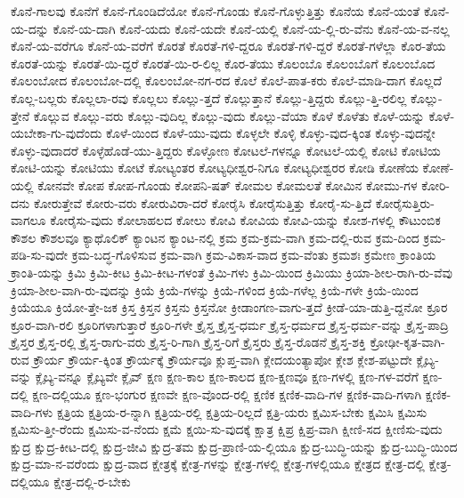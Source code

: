 {ಕೊನೆ-ಗಾಲವು
ಕೊನೆಗೆ
ಕೊನೆ-ಗೊಂಡಿದೆಯೋ
ಕೊನೆ-ಗೊಂಡು
ಕೊನೆ-ಗೊಳ್ಳುತ್ತಿತ್ತು
ಕೊನೆಯ
ಕೊನೆ-ಯಂತೆ
ಕೊನೆ-ಯ-ದನ್ನು
ಕೊನೆ-ಯ-ದಾಗಿ
ಕೊನೆ-ಯದು
ಕೊನೆ-ಯದೇ
ಕೊನೆ-ಯಲ್ಲಿ
ಕೊನೆ-ಯ-ಲ್ಲಿ-ರು-ವೆನು
ಕೊನೆ-ಯ-ವ-ನಲ್ಲ
ಕೊನೆ-ಯ-ವರೆಗೂ
ಕೊನೆ-ಯ-ವರೆಗೆ
ಕೊರತೆ
ಕೊರತೆ-ಗಳಿ-ದ್ದರೂ
ಕೊರತೆ-ಗಳಿ-ದ್ದರೆ
ಕೊರತೆ-ಗಳೆಲ್ಲಾ
ಕೊರ-ತೆಯ
ಕೊರತೆ-ಯನ್ನು
ಕೊರತೆ-ಯಿ-ದ್ದರೆ
ಕೊರತೆ-ಯಿ-ರ-ಲಿಲ್ಲ
ಕೊರ-ತೆಯು
ಕೊಲಂಬೊ
ಕೊಲಂಬೊಗೆ
ಕೊಲಂಬೊದ
ಕೊಲಂಬೋದ
ಕೊಲಂಬೋ-ದಲ್ಲಿ
ಕೊಲಂಬೋ-ನಗ-ರದ
ಕೊಲೆ
ಕೊಲೆ-ಪಾತ-ಕರು
ಕೊಲೆ-ಮಾಡಿ-ದಾಗ
ಕೊಲ್ಲದೆ
ಕೊಲ್ಲ-ಬಲ್ಲರು
ಕೊಲ್ಲಲಾ-ರವು
ಕೊಲ್ಲಲು
ಕೊಲ್ಲು-ತ್ತದೆ
ಕೊಲ್ಲುತ್ತಾನೆ
ಕೊಲ್ಲು-ತ್ತಿದ್ದರು
ಕೊಲ್ಲು-ತ್ತಿ-ರಲಿಲ್ಲ
ಕೊಲ್ಲು-ತ್ತೇನೆ
ಕೊಲ್ಲುವ
ಕೊಲ್ಲು-ವರು
ಕೊಲ್ಲು-ವುದಿಲ್ಲ
ಕೊಲ್ಲು-ವುದು
ಕೊಲ್ಲು-ವೆಯಾ
ಕೊಳೆ
ಕೊಳೆತು
ಕೊಳೆ-ಯನ್ನು
ಕೊಳೆ-ಯಬೇಕಾ-ಗು-ವುದೆಂದು
ಕೊಳೆ-ಯಿಂದ
ಕೊಳೆ-ಯು-ವುದು
ಕೊಳ್ಳಲೇ
ಕೊಳ್ಳಿ
ಕೊಳ್ಳು-ವುದ-ಕ್ಕಿಂತ
ಕೊಳ್ಳು-ವುದನ್ನೇ
ಕೊಳ್ಳು-ವುದಾದರೆ
ಕೊಳ್ಳೆಹೊಡೆ-ಯು-ತ್ತಿದ್ದರು
ಕೊಳ್ಳೋಣ
ಕೋಟಲೆ-ಗಳನ್ನೂ
ಕೋಟಲೆ-ಯಲ್ಲಿ
ಕೋಟಿ
ಕೋಟಿಯ
ಕೋಟಿ-ಯನ್ನು
ಕೋಟಿಯು
ಕೋಟೆ
ಕೋಟ್ಯಂತರ
ಕೋಟ್ಯಧೀಶ್ವರ-ನಿಗೂ
ಕೋಟ್ಯಧೀಶ್ವರರ
ಕೋಡಿ
ಕೋಣೆಯ
ಕೋಣೆ-ಯಲ್ಲಿ
ಕೋನವೇ
ಕೋಪ
ಕೋಪ-ಗೊಂಡು
ಕೋಪನಿ-ಷತ್
ಕೋಮಲ
ಕೋಮಲತೆ
ಕೋಮಿನ
ಕೋಮು-ಗಳ
ಕೋರಿ-ದನು
ಕೋರುತ್ತೇವೆ
ಕೋರು-ವರು
ಕೋರುವಿರಾ-ದರೆ
ಕೋರೈಸಿ
ಕೋರೈಸುತ್ತಿತ್ತು
ಕೋರೈ-ಸು-ತ್ತಿದೆ
ಕೋರೈಸುತ್ತಿರು-ವಾಗಲೂ
ಕೋರೈಸು-ವುದು
ಕೋಲಾಹಲದ
ಕೋಲು
ಕೋವಿ
ಕೋವಿಯ
ಕೋವಿ-ಯನ್ನು
ಕೋಶ-ಗಳಲ್ಲಿ
ಕೌಟುಂಬಿಕ
ಕೌಶಲ
ಕೌಶಲವೂ
ಕ್ಯಾಥೊಲಿಕ್
ಕ್ಯಾಂಟನ
ಕ್ಯಾಂಟ-ನಲ್ಲಿ
ಕ್ರಮ
ಕ್ರಮ-ಕ್ರಮ-ವಾಗಿ
ಕ್ರಮ-ದಲ್ಲಿ-ರುವ
ಕ್ರಮ-ದಿಂದ
ಕ್ರಮ-ಪಡಿ-ಸು-ವುದೇ
ಕ್ರಮ-ಬದ್ಧ-ಗೊಳಿಸುವ
ಕ್ರಮ-ವಾಗಿ
ಕ್ರಮ-ವಿಕಾಸ-ವಾದ
ಕ್ರಮ-ವೆಂತು
ಕ್ರಮಶಃ
ಕ್ರಮೇಣ
ಕ್ರಾಂತಿಯ
ಕ್ರಾಂತಿ-ಯನ್ನು
ಕ್ರಿಮಿ
ಕ್ರಿಮಿ-ಕೀಟ
ಕ್ರಿಮಿ-ಕೀಟ-ಗಳಂತೆ
ಕ್ರಿಮಿ-ಗಳು
ಕ್ರಿಮಿ-ಯಿಂದ
ಕ್ರಿಮಿಯು
ಕ್ರಿಯಾ-ಶೀಲ-ರಾಗಿ-ರು-ವೆವು
ಕ್ರಿಯಾ-ಶೀಲ-ವಾಗಿ-ರು-ವುದನ್ನು
ಕ್ರಿಯೆ
ಕ್ರಿಯೆ-ಗಳನ್ನು
ಕ್ರಿಯೆ-ಗಳಿಂದ
ಕ್ರಿಯೆ-ಗಳೆಲ್ಲ
ಕ್ರಿಯೆ-ಗಳೇ
ಕ್ರಿಯೆ-ಯಿಂದ
ಕ್ರಿಯೆಯೂ
ಕ್ರಿಯೋ-ತ್ತೇ-ಜಕ
ಕ್ರಿಸ್ತ
ಕ್ರಿಸ್ತನ
ಕ್ರಿಸ್ತನು
ಕ್ರಿಸ್ತನೋ
ಕ್ರೀಡಾಂಗಣ-ವಾಗು-ತ್ತದೆ
ಕ್ರೀಡೆ-ಯಾ-ಡುತ್ತಿ-ದ್ದನೋ
ಕ್ರೂರ
ಕ್ರೂರ-ವಾಗಿ-ರಲಿ
ಕ್ರೂರಿಗಳಾಗುತ್ತಾರೆ
ಕ್ರೂರಿ-ಗಳೇ
ಕ್ರೈಸ್ತ
ಕ್ರೈಸ್ತ-ಧರ್ಮ
ಕ್ರೈಸ್ತ-ಧರ್ಮದ
ಕ್ರೈಸ್ತ-ಧರ್ಮ-ವನ್ನು
ಕ್ರೈಸ್ತ-ಪಾದ್ರಿ
ಕ್ರೈಸ್ತರ
ಕ್ರೈಸ್ತ-ರಲ್ಲಿ
ಕ್ರೈಸ್ತ-ರಾಗು-ವರು
ಕ್ರೈಸ್ತ-ರಿ-ಗಾಗಿ
ಕ್ರೈಸ್ತ-ರಿಗೆ
ಕ್ರೈಸ್ತರು
ಕ್ರೈಸ್ತ-ರೊಡನೆ
ಕ್ರೈಸ್ತ-ಶಕ್ತಿ
ಕ್ರೋಢೀ-ಕೃತ-ವಾಗಿ-ರುವ
ಕ್ರೌರ್ಯ
ಕ್ರೌರ್ಯ-ಕ್ಕಿಂತ
ಕ್ರೌರ್ಯಕ್ಕೆ
ಕ್ರೌರ್ಯವೂ
ಕ್ಲುಪ್ತ-ವಾಗಿ
ಕ್ಲೇದಯಂತ್ಯಾಪೋ
ಕ್ಲೇಶ
ಕ್ಲೇಶ-ಪಟ್ಟುದೇ
ಕ್ಲೈಬ್ಯ-ವನ್ನು
ಕ್ಲೈಬ್ಯ-ವನ್ನೂ
ಕ್ಲೈಬ್ಯವೇ
ಕ್ಲೈವ್
ಕ್ಷಣ
ಕ್ಷಣ-ಕಾಲ
ಕ್ಷಣ-ಕಾಲದ
ಕ್ಷಣ-ಕ್ಷಣವೂ
ಕ್ಷಣ-ಗಳಲ್ಲಿ
ಕ್ಷಣ-ಗಳ-ವರೆಗೆ
ಕ್ಷಣ-ದಲ್ಲಿ
ಕ್ಷಣ-ದಲ್ಲಿಯೂ
ಕ್ಷಣ-ಭಂಗುರ
ಕ್ಷಣವೇ
ಕ್ಷಣ-ವೊಂದ-ರಲ್ಲಿ
ಕ್ಷಣಿಕ
ಕ್ಷಣಿಕ-ವಾದಿ-ಗಳ
ಕ್ಷಣಿಕ-ವಾದಿ-ಗಳಾಗಿ
ಕ್ಷಣಿಕ-ವಾದಿ-ಗಳು
ಕ್ಷತ್ರಿಯ
ಕ್ಷತ್ರಿಯ-ರ-ನ್ನಾಗಿ
ಕ್ಷತ್ರಿಯ-ರಲ್ಲಿ
ಕ್ಷತ್ರಿಯ-ರಿಲ್ಲದೆ
ಕ್ಷತ್ರಿ-ಯರು
ಕ್ಷಮಿಸ-ಬೇಕು
ಕ್ಷಮಿಸಿ
ಕ್ಷಮಿಸು
ಕ್ಷಮಿಸು-ತ್ತೀ-ರೆಂದು
ಕ್ಷಮಿಸು-ವ-ನೆಂದು
ಕ್ಷಮೆ
ಕ್ಷಯಿ-ಸು-ವುದಕ್ಕೆ
ಕ್ಷಾತ್ರ
ಕ್ಷಿಪ್ರ
ಕ್ಷಿಪ್ರ-ವಾಗಿ
ಕ್ಷೀಣಿ-ಸದ
ಕ್ಷೀಣಿಸು-ವುದು
ಕ್ಷುದ್ರ
ಕ್ಷುದ್ರ-ಕೀಟ-ದಲ್ಲಿ
ಕ್ಷುದ್ರ-ಜೀವಿ
ಕ್ಷುದ್ರ-ತಮ
ಕ್ಷುದ್ರ-ಪ್ರಾಣಿ-ಯ-ಲ್ಲಿಯೂ
ಕ್ಷುದ್ರ-ಬುದ್ಧಿ-ಯನ್ನು
ಕ್ಷುದ್ರ-ಬುದ್ಧಿ-ಯಿಂದ
ಕ್ಷುದ್ರ-ಮಾ-ನ-ವರೆಂದು
ಕ್ಷುದ್ರ-ವಾದ
ಕ್ಷೇತ್ರಕ್ಕೆ
ಕ್ಷೇತ್ರ-ಗಳನ್ನು
ಕ್ಷೇತ್ರ-ಗಳಲ್ಲಿ
ಕ್ಷೇತ್ರ-ಗಳಲ್ಲಿಯೂ
ಕ್ಷೇತ್ರದ
ಕ್ಷೇತ್ರ-ದಲ್ಲಿ
ಕ್ಷೇತ್ರ-ದಲ್ಲಿಯೂ
ಕ್ಷೇತ್ರ-ದಲ್ಲಿ-ರ-ಬೇಕು
}
